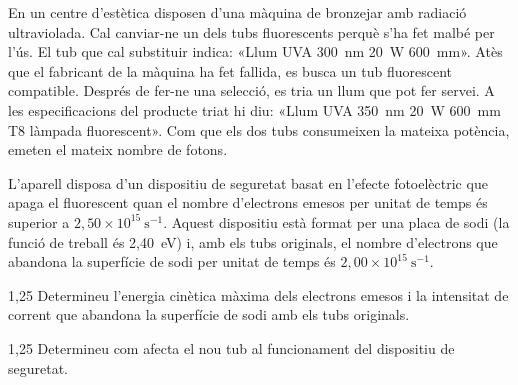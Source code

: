 En un centre d'estètica disposen d'una màquina de bronzejar amb radiació ultraviolada. Cal canviar-ne un dels tubs fluorescents perquè s'ha fet malbé per l'ús. El tub que cal substituir indica: «Llum UVA 300~nm 20~W 600~mm». Atès que el fabricant de la màquina ha fet fallida, es busca un tub fluorescent compatible. Després de fer-ne una selecció, es tria un llum que pot fer servei. A les especificacions del producte triat hi diu: «Llum UVA 350~nm 20~W 600~mm T8 làmpada fluorescent». Com que els dos tubs consumeixen la mateixa potència, emeten el mateix nombre de fotons.

L'aparell disposa d'un dispositiu de seguretat basat en l'efecte fotoelèctric que apaga el fluorescent quan el nombre d'electrons emesos per unitat de temps és superior a $2,50\times 10^{15}\ \mathrm{s^{-1}}$. Aquest dispositiu està format per una placa de sodi (la funció de treball és 2,40~eV) i, amb els tubs originals, el nombre d'electrons que abandona la superfície de sodi per unitat de temps és $2,00\times 10^{15}\ \mathrm{s^{-1}}$.

\begin{apartat}{1,25}
Determineu l'energia cinètica màxima dels electrons emesos i la intensitat de corrent que abandona la superfície de sodi amb els tubs originals.
\end{apartat}

\begin{apartat}{1,25}
Determineu com afecta el nou tub al funcionament del dispositiu de seguretat.
\end{apartat}

